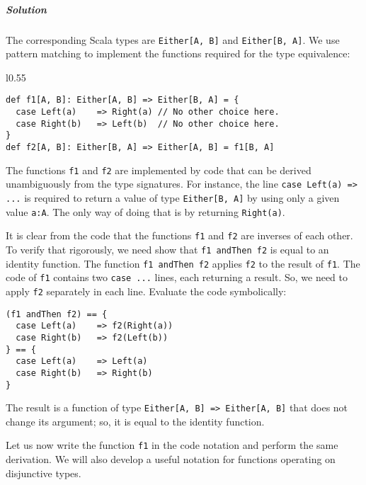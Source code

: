 \subparagraph{Solution}

The corresponding Scala types are \lstinline!Either[A, B]! and \lstinline!Either[B, A]!.
We use pattern matching to implement the functions required for the
type equivalence:

\begin{wrapfigure}{l}{0.55\columnwidth}%
\vspace{-0.86\baselineskip}
\begin{lstlisting}
def f1[A, B]: Either[A, B] => Either[B, A] = {
  case Left(a)    => Right(a) // No other choice here.
  case Right(b)   => Left(b)  // No other choice here.
}
def f2[A, B]: Either[B, A] => Either[A, B] = f1[B, A]
\end{lstlisting}

\vspace{-1.2\baselineskip}
\end{wrapfigure}%
The functions \lstinline!f1! and \lstinline!f2! are implemented
by code that can be derived unambiguously from the type signatures.
For instance, the line \lstinline!case Left(a) => ...! is required
to return a value of type \lstinline!Either[B, A]! by using only
a given value \lstinline!a:A!. The only way of doing that is by returning
\lstinline!Right(a)!.

It is clear from the code that the functions \lstinline!f1! and \lstinline!f2!
are inverses of each other. To verify that rigorously, we need show
that \lstinline!f1 andThen f2! is equal to an identity function.
The function \lstinline!f1 andThen f2! applies \lstinline!f2! to
the result of \lstinline!f1!. The code of \lstinline!f1! contains
two \lstinline!case ...! lines, each returning a result. So, we need
to apply \lstinline!f2! separately in each line. Evaluate the code
symbolically:
\begin{lstlisting}
(f1 andThen f2) == {
  case Left(a)    => f2(Right(a))
  case Right(b)   => f2(Left(b))
} == {
  case Left(a)    => Left(a)
  case Right(b)   => Right(b)
}
\end{lstlisting}
The result is a function of type \lstinline!Either[A, B] => Either[A, B]!
that does not change its argument; so, it is equal to the identity
function. 

Let us now write the function \lstinline!f1! in the code notation
and perform the same derivation. We will also develop a useful notation
for functions operating on disjunctive types.

